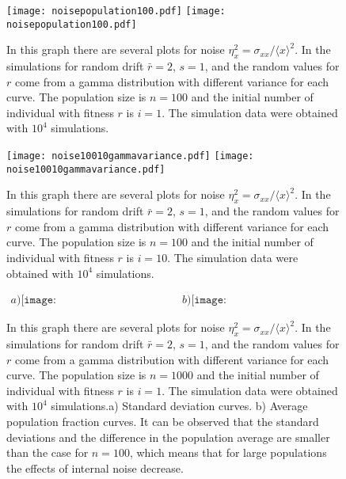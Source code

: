 \begin{figure}[H]
  \begin{center}
    \leavevmode
    \ifpdf
      \texttt{[image: noisepopulation100.pdf]}
    \else
      \texttt{[image: noisepopulation100.pdf]}
    \fi
    \caption{In this graph there are several plots for  noise $\eta_{x}^{2}=\sigma_{xx}/\langle x\rangle^2$. In the simulations for random drift $\bar{r}=2$, $s=1$, and the random values for $r$ come from a gamma distribution with different variance for each curve. The population size is $n=100$ and the initial number of individual with fitness $r$ is  $i=1$. The simulation data were obtained with $10^4$ simulations.}
    \label{}
  \end{center}
  \end{figure}

\begin{figure}[H]
  \begin{center}
    \leavevmode
    \ifpdf
      \texttt{[image: noise10010gammavariance.pdf]}
    \else
      \texttt{[image: noise10010gammavariance.pdf]}
    \fi
    \caption{In this graph there are several plots for  noise $\eta_{x}^{2}=\sigma_{xx}/\langle x\rangle^2$. In the simulations for random drift $\bar{r}=2$, $s=1$, and the random values for $r$ come from a gamma distribution with different variance for each curve. The population size is $n=100$ and the initial number of individual with fitness $r$ is  $i=10$. The simulation data were obtained with $10^4$ simulations.}
    \label{}
  \end{center}
  \end{figure}
  
\begin{figure}[H]
\begin{center}$
\begin{array}{cc}
a)\texttt{[image: VarianceTime10001noise.pdf]} &
b)\texttt{[image: AverageTime10001noise.pdf]}
\end{array}$
\end{center}
\caption{In this graph there are several plots for  noise $\eta_{x}^{2}=\sigma_{xx}/\langle x\rangle^2$. In the simulations for random drift $\bar{r}=2$, $s=1$, and the random values for $r$ come from a gamma distribution with different variance for each curve. The population size is $n=1000$ and the initial number of individual with fitness $r$ is  $i=1$. The simulation data were obtained with $10^4$ simulations.a) Standard deviation curves. b) Average population fraction curves. It can be observed that the standard deviations and the difference in the population average are smaller than the case for $n=100$, which means that for large populations the effects of internal noise decrease.}
\label{}
\end{figure}



